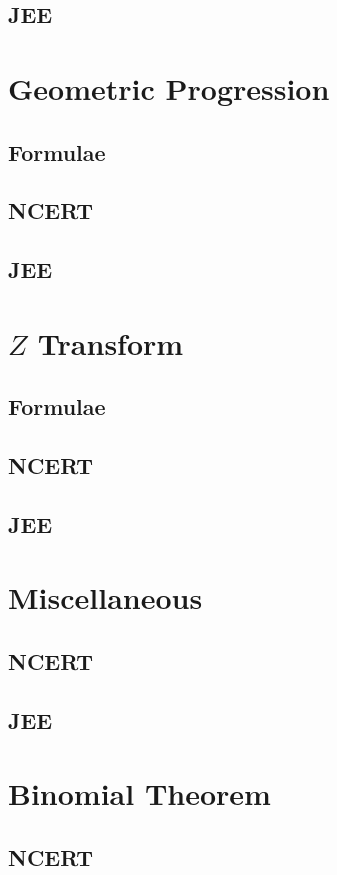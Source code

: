 \documentclass[journal]{IEEEtran}
\begin{document}
\subsection{JEE}

\section{Geometric Progression}
\subsection{Formulae}

\subsection{NCERT}

\subsection{JEE}

\section{$Z$ Transform}
\subsection{Formulae}

\subsection{NCERT}

\subsection{JEE}

\section{Miscellaneous}
\subsection{NCERT}

\subsection{JEE}

\section{Binomial Theorem}
\subsection{NCERT}

\end{document}
